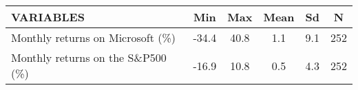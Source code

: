 \begin{tabular}{lccccc} 
\toprule
VARIABLES & Min & Max & Mean & Sd & N \\
 \midrule
Monthly returns on Microsoft (\%) & -34.4 & 40.8 & 1.1 & 9.1 & 252 \\
Monthly returns on the S\&P500 (\%)& -16.9 & 10.8 & 0.5 & 4.3 & 252 \\ 
\bottomrule
\end{tabular}
